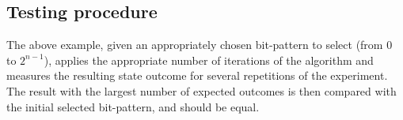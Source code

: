 \subsection{Testing procedure}
The above example, given an appropriately chosen bit-pattern to select (from $0$ to $2^{n-1}$), applies the appropriate number of iterations of the algorithm and measures the resulting state outcome for several repetitions of the experiment. The result with the largest number of expected outcomes is then compared with the initial selected bit-pattern, and should be equal. 
